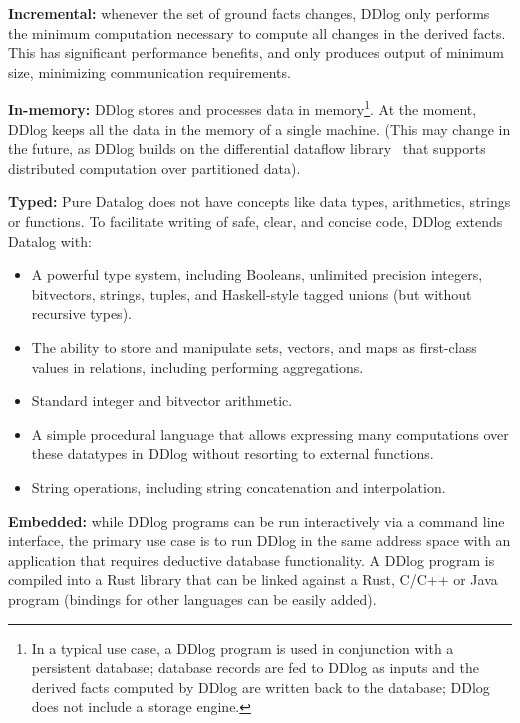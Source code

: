 \textbf{Incremental:} whenever the set of ground facts changes, DDlog
only performs the minimum computation necessary to compute all changes
in the derived facts.  This has significant performance benefits, and
only produces output of minimum size, minimizing communication
requirements.

\textbf{In-memory:} DDlog stores and processes data in
memory\footnote{In a typical use case, a DDlog program is used in
  conjunction with a persistent database; database records are fed to
  DDlog as inputs and the derived facts computed by DDlog are written
  back to the database; DDlog does not include a storage engine.}.  At
the moment, DDlog keeps all the data in the memory of a single
machine.  (This may change in the future, as DDlog builds on the
differential dataflow library~\cite{dd} that supports distributed
computation over partitioned data).

\textbf{Typed:} Pure Datalog does not have concepts like data types,
arithmetics, strings or functions.  To facilitate writing of safe,
clear, and concise code, DDlog extends Datalog with:
\begin{itemize}
\item A powerful type system, including Booleans, unlimited
  precision integers, bitvectors, strings, tuples, and
  Haskell-style tagged unions (but without recursive types).
  
\item The ability to store and manipulate sets, vectors, and maps as
  first-class values in relations, including performing aggregations.
  
\item Standard integer and bitvector arithmetic.
  
\item A simple procedural language that allows expressing many
  computations over these datatypes in DDlog without resorting to
  external functions.
  
\item String operations, including string concatenation and
  interpolation.
\end{itemize}

\textbf{Embedded:} while DDlog programs can be run interactively via a
command line interface, the primary use case is to run DDlog in the
same address space with an application that requires deductive
database functionality.  A DDlog program is compiled into a Rust
library that can be linked against a Rust, C/C++ or Java program
(bindings for other languages can be easily added).
